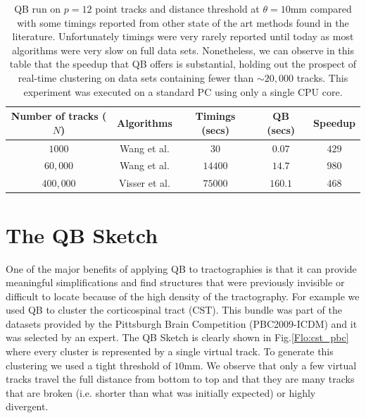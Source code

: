 \documentclass[preprint,authoryear,a4paper,10pt,onecolumn]{elsarticle}
\begin{document}
%
\begin{table}
\small\addtolength{\tabcolsep}{-5pt}

\begin{centering}
\begin{tabular}{|c|c|c|c|c|}
\hline 
Number of tracks ($N$) & Algorithms & Timings (secs) & QB (secs) & Speedup\tabularnewline
\hline
\hline 
$1000$ & Wang et al. \cite{wang2010tractography} & $30$ & $0.07$ & $429$\tabularnewline
\hline 
$60,000$ & Wang et al. \cite{wang2010tractography} & $14400$ & $14.7$ & $980$\tabularnewline
\hline 
$400,000$ & Visser et al. \cite{Visser2010} & $75000$ & $160.1$ & $468$\tabularnewline
\hline
\end{tabular}
\par\end{centering}

\caption{QB run on $p=12$ point tracks and distance threshold at $\theta=10$mm
compared with some timings reported from other state of the art methods
found in the literature. Unfortunately timings were very rarely reported
until today as most algorithms were very slow on full data sets. Nonetheless,
we can observe in this table that the speedup that QB offers is substantial,
holding out the prospect of real-time clustering on data sets containing
fewer than $\sim 20,000$ tracks. This experiment was executed on a
standard PC using only a single CPU core. }

\label{Flo:timings}
\end{table}

\section{The QB Sketch}

One of the major benefits of applying QB to tractographies is that it
can provide meaningful simplifications and find structures that were
previously invisible or difficult to locate because of the high density
of the tractography. For example we used QB to cluster the corticospinal
tract (CST). This bundle was part of the datasets provided by the
Pittsburgh Brain Competition (PBC2009-ICDM) and it was selected by an
expert. The QB Sketch is clearly shown in Fig.\ref{Flo:cst_pbc} where
every cluster is represented by a single virtual track. To generate this
clustering we used a tight threshold of $10$mm. We observe that only a
few virtual tracks travel the full distance from bottom to top and that
they are many tracks that are broken (i.e. shorter than what was
initially expected) or highly divergent.
\end{document}
